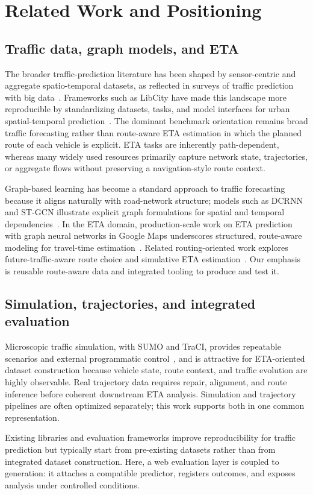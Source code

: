 \section{Related Work and Positioning}\label{sec:related}

\subsection{Traffic data, graph models, and ETA}
The broader traffic-prediction literature has been shaped by sensor-centric and aggregate spatio-temporal datasets, as reflected in surveys of traffic prediction with big data~\cite{yu2017trafficpred}. Frameworks such as LibCity have made this landscape more reproducible by standardizing datasets, tasks, and model interfaces for urban spatial-temporal prediction~\cite{libcity2021}. The dominant benchmark orientation remains broad traffic forecasting rather than route-aware ETA estimation in which the planned route of each vehicle is explicit. ETA tasks are inherently path-dependent, whereas many widely used resources primarily capture network state, trajectories, or aggregate flows without preserving a navigation-style route context.

Graph-based learning has become a standard approach to traffic forecasting because it aligns naturally with road-network structure; models such as DCRNN and ST-GCN illustrate explicit graph formulations for spatial and temporal dependencies~\cite{dcrnn2018,stgcn2018}. In the ETA domain, production-scale work on ETA prediction with graph neural networks in Google Maps underscores structured, route-aware modeling for travel-time estimation~\cite{googlemapseta2021}. Related routing-oriented work explores future-traffic-aware route choice and simulative ETA estimation~\cite{voloch2021,voloch2025}. Our emphasis is reusable route-aware data and integrated tooling to produce and test it.

\subsection{Simulation, trajectories, and integrated evaluation}
Microscopic traffic simulation, with SUMO and TraCI, provides repeatable scenarios and external programmatic control~\cite{sumo2011,traci2018}, and is attractive for ETA-oriented dataset construction because vehicle state, route context, and traffic evolution are highly observable. Real trajectory data requires repair, alignment, and route inference before coherent downstream ETA analysis. Simulation and trajectory pipelines are often optimized separately; this work supports both in one common representation.

Existing libraries and evaluation frameworks improve reproducibility for traffic prediction but typically start from pre-existing datasets rather than from integrated dataset construction. Here, a web evaluation layer is coupled to generation: it attaches a compatible predictor, registers outcomes, and exposes analysis under controlled conditions.

